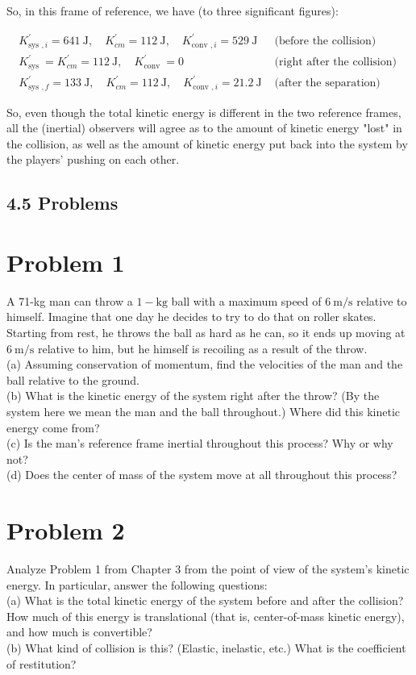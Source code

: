 \documentclass[10pt]{article}
\begin{document}
So, in this frame of reference, we have (to three significant figures):

$$
\begin{aligned}
K_{\text {sys }, i}^{\prime}=641 \mathrm{~J}, \quad K_{c m}^{\prime}=112 \mathrm{~J}, \quad K_{\text {conv }, i}^{\prime}=529 \mathrm{~J} & \text { (before the collision) } \\
K_{\text {sys }}^{\prime}=K_{c m}^{\prime}=112 \mathrm{~J}, \quad K_{\text {conv }}^{\prime}=0 & \text { (right after the collision) } \\
K_{\text {sys }, f}^{\prime}=133 \mathrm{~J}, \quad K_{c m}^{\prime}=112 \mathrm{~J}, \quad K_{\text {conv }, i}^{\prime}=21.2 \mathrm{~J} & \text { (after the separation) }
\end{aligned}
$$

So, even though the total kinetic energy is different in the two reference frames, all the (inertial) observers will agree as to the amount of kinetic energy "lost" in the collision, as well as the amount of kinetic energy put back into the system by the players' pushing on each other.

\subsection*{4.5 Problems}
\section*{Problem 1}
A 71-kg man can throw a $1-\mathrm{kg}$ ball with a maximum speed of $6 \mathrm{~m} / \mathrm{s}$ relative to himself. Imagine that one day he decides to try to do that on roller skates. Starting from rest, he throws the ball as hard as he can, so it ends up moving at $6 \mathrm{~m} / \mathrm{s}$ relative to him, but he himself is recoiling as a result of the throw.\\
(a) Assuming conservation of momentum, find the velocities of the man and the ball relative to the ground.\\
(b) What is the kinetic energy of the system right after the throw? (By the system here we mean the man and the ball throughout.) Where did this kinetic energy come from?\\
(c) Is the man's reference frame inertial throughout this process? Why or why not?\\
(d) Does the center of mass of the system move at all throughout this process?

\section*{Problem 2}
Analyze Problem 1 from Chapter 3 from the point of view of the system's kinetic energy. In particular, answer the following questions:\\
(a) What is the total kinetic energy of the system before and after the collision? How much of this energy is translational (that is, center-of-mass kinetic energy), and how much is convertible?\\
(b) What kind of collision is this? (Elastic, inelastic, etc.) What is the coefficient of restitution?
\end{document}
